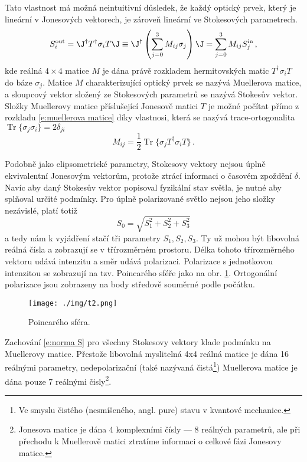 Tato vlastnost má možná neintuitivní důsledek, že každý optický prvek, který je lineární v Jonesových vektorech, je zároveň lineární ve Stokesových parametrech.
\begin{equation} \label{e:muellerova matice}
S^\textrm{out}_i=\J^\dagger T^\dagger \sigma_i T \J\equiv\J^\dagger \left(\sum_{j=0}^{3} M_{ij} \sigma_j \right) \J=\sum_{j=0}^{3} M_{ij} S^\textrm{in}_j \,,
\end{equation}
kde reálná $4\times 4$ matice $M$ je dána právě rozkladem hermitovských matic $T^\dagger \sigma_i T$ do báze $\sigma_j$.
Matice $M$ charakterizující optický prvek se nazývá Muellerova matice, a sloupcový vektor složený ze Stokesových parametrů se nazývá Stokesův vektor.
Složky Muellerovy matice příslušející Jonesově matici $T$ je možné počítat přímo z rozkladu \eqref{e:muellerova matice} díky vlastnosi, která se nazývá trace-ortogonalita $\operatorname{Tr}\lbrace\sigma_j\sigma_i\rbrace=2\delta_{ji}$
\begin{equation} \label{e:mueller rozklad}
M_{ij}=\frac{1}{2}\operatorname{Tr}\lbrace \sigma_j T^\dagger \sigma_i T \rbrace \,.
\end{equation}

Podobně jako elipsometrické parametry, Stokesovy vektory nejsou úplně ekvivalentní Jonesovým vektorům, protože ztrácí informaci o časovém zpoždění $\delta$.
Navíc aby daný Stokesův vektor popisoval fyzikální stav světla, je nutné aby splňoval určité podmínky.
Pro úplně polarizované světlo nejsou jeho složky nezávislé, platí totiž
\begin{equation} \label{e:norma S}
S_0=\sqrt{S_1^2+S_2^2+S_3^2}
\end{equation}
a tedy nám k vyjádření stačí tři parametry $S_1, S_2, S_3$.
Ty už mohou být libovolná reálná čísla a zobrazují se v třírozměrném prostoru.
Délka tohoto třírozměrného vektoru udává intenzitu a směr udává polarizaci.
Polarizace s jednotkovou intenzitou se zobrazují na tzv. Poincarého sféře jako na obr. \ref{f:poincareho sfera}.
Ortogonální polarizace jsou zobrazeny na body středově souměrné podle počátku.

\begin{figure}
\texttt{[image: ./img/t2.png]}\centering
\caption{Poincarého sféra.}\label{f:poincareho sfera}
\end{figure}

Zachování \eqref{e:norma S} pro všechny Stokesovy vektory klade podmínku na Muellerovy matice.
Přestože libovolná myslitelná 4x4 reálná matice je dána 16 reálnými parametry, nedepolarizační (také nazývaná čistá\footnote{Ve smyslu čistého (nesmíšeného, angl. pure) stavu v kvantové mechanice.}) Muellerova matice je dána pouze 7 reálnými čisly\footnote{Jonesova matice je dána 4 komplexními čísly --- 8 reálných parametrů, ale při přechodu k Muellerově matici ztratíme informaci o celkové fázi Jonesovy matice.}. \cite{Muellerdiff}

